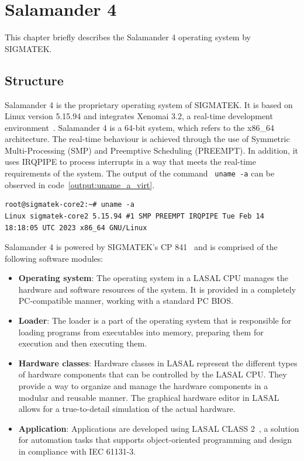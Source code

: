 \documentclass[MMR,Master,english]{twbook}
\begin{document}
\clearpage

\chapter{Salamander 4}\label{cha:salamander4}
This chapter briefly describes the Salamander 4 operating system by SIGMATEK. 

\section{Structure}
\noindent Salamander 4 is the proprietary operating system of SIGMATEK. It is based on Linux version 5.15.94 and integrates Xenomai 3.2, a real-time development environment~\cite{XenomaiXenomai}. Salamander 4 is a 64-bit system, which refers to the x86\_64 architecture. The real-time behaviour is achieved through the use of Symmetric Multi-Processing (SMP) and Preemptive Scheduling (PREEMPT). In addition, it uses IRQPIPE to process interrupts in a way that meets the real-time requirements of the system. The output of the command ~\texttt{uname -a} can be observed in code~\ref{output:uname_a_virt}.

\vspace{1em}
\begin{minipage}{0.95\columnwidth}
	\begin{lstlisting}[name={System information},label={output:uname_a_virt}]
root@sigmatek-core2:~# uname -a
Linux sigmatek-core2 5.15.94 #1 SMP PREEMPT IRQPIPE Tue Feb 14 18:18:05 UTC 2023 x86_64 GNU/Linux
\end{lstlisting}
\end{minipage}

\noindent Salamander 4 is powered by SIGMATEK's CP 841~\cite{CPUEinheitenSIGMATEK} and is comprised of the following software modules:

 \begin{itemize}
	\item \textbf{Operating system}: The operating system in a LASAL CPU manages the hardware and software resources of the system. It is provided in a completely PC-compatible manner, working with a standard PC BIOS.
	\item \textbf{Loader}: The loader is a part of the operating system that is responsible for loading programs from executables into memory, preparing them for execution and then executing them.
	\item \textbf{Hardware classes}: Hardware classes in LASAL represent the different types of hardware components that can be controlled by the LASAL CPU. They provide a way to organize and manage the hardware components in a modular and reusable manner. The graphical hardware editor in LASAL allows for a true-to-detail simulation of the actual hardware.
	\item \textbf{Application}: Applications are developed using LASAL CLASS 2~\cite{EngineeringToolLASAL}, a solution for automation tasks that supports object-oriented programming and design in compliance with IEC 61131-3.
\end{itemize}
\end{document}

